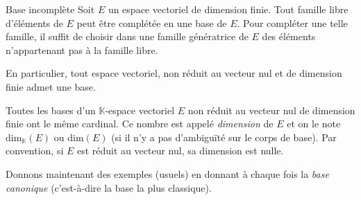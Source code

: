 \documentclass[french,11pt,twoside]{VcCours}
\begin{document}
 
 \begin{Theoreme}{Base incomplète}\label{BaseInc}
 Soit $E$ un espace vectoriel de dimension finie. Tout famille libre d'éléments de $E$ peut être complétée en une base de $E$. Pour compléter une telle famille, il suffit de choisir dans une famille génératrice de $E$ des éléments n'appartenant pas à la famille libre.
 
 \medskip
 
En particulier, tout espace vectoriel, non réduit au vecteur nul et de dimension finie admet une base.
 \end{Theoreme}
% 
% 

 \begin{Theoreme}{} Toutes les bases d'un $\mathbb{K}$-espace vectoriel $E$ non réduit au vecteur nul de dimension finie ont le même cardinal. Ce nombre est appelé \emph{dimension} de $E$ et on le note $\textrm{dim}_{\mathbb{K}}(E)$ ou $\textrm{dim}(E)$ (si il n'y a pas d'ambiguïté sur le corps de base). Par convention, si $E$ est réduit au vecteur nul, sa dimension est nulle.
 \end{Theoreme}
 
\newpage
 
 Donnons maintenant des exemples (usuels) en donnant à chaque fois la \emph{base canonique} (c'est-à-dire la base la plus classique).
 
 \medskip
 
\end{document}

